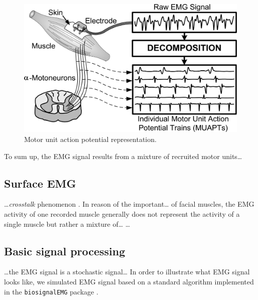 \documentclass[12pt,]{book}
\theoremstyle{definition}
\theoremstyle{definition}
\theoremstyle{definition}
\theoremstyle{remark}
\begin{document}
\begin{figure}[H]

{\centering \includegraphics{assets/muap} 

}

\caption{Motor unit action potential representation.}\label{fig:unnamed-chunk-1}
\end{figure}

To sum up, the EMG signal results from a mixture of recruited motor
units\ldots{}

\subsection{Surface EMG}\label{surface-emg}

\ldots{}\emph{crosstalk} phenomenon \citep{de_luca_use_1997}. In reason
of the important\ldots{} of facial muscles, the EMG activity of one
recorded muscle generally does not represent the activity of a single
muscle but rather a mixture of\ldots{} \citet{Rapin2011}\ldots{}

\subsection{Basic signal processing}\label{basic-signal-processing}

\ldots{}the EMG signal is a stochastic signal\ldots{} In order to
illustrate what EMG signal looks like, we simulated EMG signal based on
a standard algorithm implemented in the \texttt{biosignalEMG} package
\citep{R-biosignalEMG}.
\end{document}
